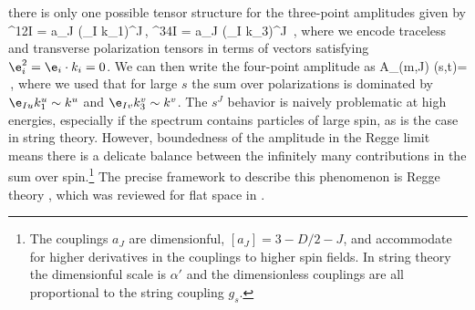 there is only one possible tensor structure for the three-point amplitudes given by
	\beq
		  ^{12I} = a_J (\e_I \cdot k_1)^{J}\,, \qquad \qquad
		  ^{34I} = a_J (\e_I \cdot k_3)^{J}
		\,,
	\eeq
where we encode traceless and transverse polarization tensors in terms of
vectors satisfying $\e_i^2 =  \e_i \cdot k_i = 0$.
We can then   write the four-point amplitude as
	\beq
		 A_{(m,J)} (s,t)=  
		\approx
		   \,,
		\label{eq:A_spinning_flat}
	\eeq
where  we used that for large $s$ the sum over polarizations is dominated by $\e_{Iu} k_1^u \sim k^u$ and $\e_{Iv} k_3^v \sim k^v$.
The $s^J$ behavior is naively problematic at high energies, especially if the spectrum contains particles of large spin, as is the case in string theory. However, boundedness of the amplitude in the Regge limit means there is a delicate balance between the infinitely many contributions in the sum over spin.\footnote{The couplings $a_J$  are dimensionful,  $[a_J]= 3- D/2 -J$, and accommodate for higher derivatives in the couplings to higher spin fields. In string theory the dimensionful scale is $\alpha'$ and the dimensionless couplings are all proportional to the string coupling $g_s$.} The precise framework to describe this phenomenon is Regge theory \cite{Regge:1959mz}, which was reviewed for flat space in \cite{Costa:2012cb,Caron-Huot:2020nem}.

